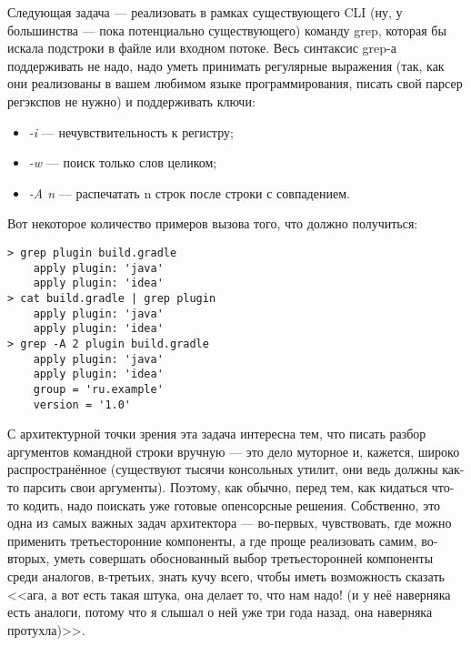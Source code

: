 \documentclass[a5paper]{article}
\begin{document}
Следующая задача --- реализовать в рамках существующего CLI (ну, у большинства --- пока потенциально существующего) команду grep, которая бы искала подстроки в файле или входном потоке. Весь синтаксис grep-а поддерживать не надо, надо уметь принимать регулярные выражения (так, как они реализованы в вашем любимом языке программирования, писать свой парсер регэкспов не нужно) и поддерживать ключи:
\begin{itemize}
	\item \textit{-i} --- нечувствительность к регистру;
	\item \textit{-w}  --- поиск только слов целиком;
	\item \textit{-A n} --- распечатать n строк после строки с совпадением.
\end{itemize}

Вот некоторое количество примеров вызова того, что должно получиться:
\begin{verbatim}
> grep plugin build.gradle
    apply plugin: 'java'
    apply plugin: 'idea'
> cat build.gradle | grep plugin
    apply plugin: 'java'
    apply plugin: 'idea'
> grep -A 2 plugin build.gradle
    apply plugin: 'java'
    apply plugin: 'idea'
    group = 'ru.example'
    version = '1.0'
\end{verbatim}

С архитектурной точки зрения эта задача интересна тем, что писать разбор аргументов командной строки вручную --- это дело муторное и, кажется, широко распространённое (существуют тысячи консольных утилит, они ведь должны как-то парсить свои аргументы). Поэтому, как обычно, перед тем, как кидаться что-то кодить, надо поискать уже готовые опенсорсные решения. Собственно, это одна из самых важных задач архитектора --- во-первых, чувствовать, где можно применить третьесторонние компоненты, а где проще реализовать самим, во-вторых, уметь совершать обоснованный выбор третьесторонней компоненты среди аналогов, в-третьих, знать кучу всего, чтобы иметь возможность сказать <<ага, а вот есть такая штука, она делает то, что нам надо! (и у неё наверняка есть аналоги, потому что я слышал о ней уже три года назад, она наверняка протухла)>>.
\end{document}
